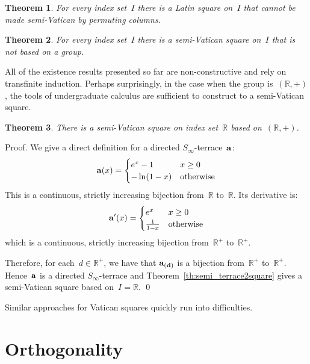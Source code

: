 \documentclass[12pt,a4paper]{article}
\newtheorem{thm}{Theorem}[section]
\newcommand{\R}{\mathbb{R}}
\begin{document}
\begin{thm}\label{th:semi_notrcls}
For every index set~$I$ 
there is a Latin square on~$I$ that cannot be made semi-Vatican by permuting columns.
\end{thm}

\begin{thm}\label{th:semi_infvat}
For every index set~$I$ there is a semi-Vatican square on~$I$ that is not based on a  group.
\end{thm}

All of the existence results presented so far are non-constructive and rely on transfinite induction.  Perhaps surprisingly, in the case when the group is~$(\R, +)$, the tools of undergraduate calculus are sufficient to construct to a semi-Vatican square.


\begin{thm}\label{th:svr}
There is a semi-Vatican square on index set~$\R$ based on~$(\R,+)$.
\end{thm} 

\noindent
Proof.   We give a direct definition for a directed $S_{\infty}$-terrace~${\bf a}$:
\begin{equation*}
    {\bf a}(x) = \begin{cases}
               e^x   -1            & x \geq 0\\
               -\ln (1-x)       & \text{otherwise}
           \end{cases}
\end{equation*}
This is a continuous, strictly increasing bijection from~$\R$ to~$\R$.  Its derivative is:
\begin{equation*}
    {\bf a}'(x) = \begin{cases}
               e^x               & x \geq 0\\
              \frac{1}{1-x}       & \text{otherwise}
           \end{cases}
\end{equation*}
which is a continuous, strictly increasing bijection from~$\R^+$ to~$\R^+$.

Therefore, for each~$d \in \R^+$, we have that ${\bf a_{(d)}}$ is a bijection from~$\R^+$ to~$\R^+$.  Hence~${\bf a}$ is a directed $S_{\infty}$-terrace and Theorem~\ref{th:semi_terrace2square} gives a semi-Vatican square based on~$I = \R$.
\qed

Similar approaches for Vatican squares quickly run into difficulties.



\section{Orthogonality}\label{sec:orth}
\end{document}
